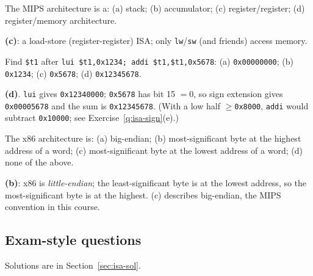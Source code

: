 \begin{exercise}[Lecturer 3]
The MIPS architecture is a: (a) stack; (b) accumulator; (c) register/register;
(d) register/memory architecture.
\end{exercise}
\begin{solution}
\textbf{(c)}: a load-store (register-register) ISA; only \texttt{lw}/\texttt{sw}
(and friends) access memory.
\end{solution}

\begin{exercise}[Lecturer 4]
Find \texttt{\$t1} after \texttt{lui \$t1,0x1234; addi \$t1,\$t1,0x5678}:
(a) \texttt{0x00000000}; (b) \texttt{0x1234}; (c) \texttt{0x5678};
(d) \texttt{0x12345678}.
\end{exercise}
\begin{solution}
\textbf{(d)}. \texttt{lui} gives \texttt{0x12340000}; \texttt{0x5678} has bit 15 $=0$,
so sign extension gives \texttt{0x00005678} and the sum is \texttt{0x12345678}.
(With a low half $\ge$\texttt{0x8000}, \texttt{addi} would subtract
\texttt{0x10000}; see Exercise~\ref{q:isa-sign}(e).)
\end{solution}

\begin{exercise}[Lecturer 5]
The x86 architecture is: (a) big-endian; (b) most-significant byte at the highest
address of a word; (c) most-significant byte at the lowest address of a word;
(d) none of the above.
\end{exercise}
\begin{solution}
\textbf{(b)}: x86 is \emph{little-endian}; the least-significant byte is at the
lowest address, so the most-significant byte is at the highest. (c) describes
big-endian, the MIPS convention in this course.
\end{solution}

\subsection{Exam-style questions}
Solutions are in Section~\ref{sec:isa-sol}.

